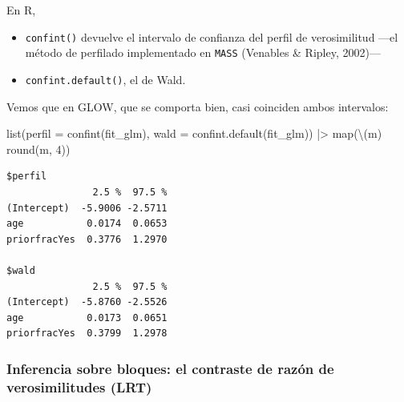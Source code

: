 \documentclass[
  letterpaper,
  DIV=11,
  numbers=noendperiod]{scrartcl}
\newenvironment{Shaded}{\begin{snugshade}}{\end{snugshade}}
\newcommand{\AttributeTok}[1]{\textcolor[rgb]{0.40,0.45,0.13}{#1}}
\newcommand{\DecValTok}[1]{\textcolor[rgb]{0.68,0.00,0.00}{#1}}
\newcommand{\FunctionTok}[1]{\textcolor[rgb]{0.28,0.35,0.67}{#1}}
\newcommand{\NormalTok}[1]{\textcolor[rgb]{0.00,0.23,0.31}{#1}}
\newcommand{\SpecialCharTok}[1]{\textcolor[rgb]{0.37,0.37,0.37}{#1}}
\providecommand{\tightlist}{%
  \setlength{\itemsep}{0pt}\setlength{\parskip}{0pt}}\usepackage{longtable,booktabs,array}
\begin{document}
\begin{tcolorbox}[enhanced jigsaw, coltitle=black, rightrule=.15mm, arc=.35mm, leftrule=.75mm, colback=white, colbacktitle=quarto-callout-tip-color!10!white, left=2mm, breakable, toptitle=1mm, toprule=.15mm, bottomtitle=1mm, titlerule=0mm, title=\textcolor{quarto-callout-tip-color}{\faLightbulb}\hspace{0.5em}{🔧 En R. Intervalos de confianza sobre los coeficientes}, bottomrule=.15mm, opacityback=0, opacitybacktitle=0.6, colframe=quarto-callout-tip-color-frame]

En R,

\begin{itemize}
\tightlist
\item
  \texttt{confint()} devuelve el intervalo de confianza del perfil de
  verosimilitud ---el método de perfilado implementado en \texttt{MASS}
  (Venables \& Ripley, 2002)---
\item
  \texttt{confint.default()}, el de Wald.
\end{itemize}

\end{tcolorbox}

Vemos que en GLOW, que se comporta bien, casi coinciden ambos
intervalos:

\begin{Shaded}
\begin{Highlighting}[]
\FunctionTok{list}\NormalTok{(}\AttributeTok{perfil =} \FunctionTok{confint}\NormalTok{(fit\_glm),}
     \AttributeTok{wald   =} \FunctionTok{confint.default}\NormalTok{(fit\_glm)) }\SpecialCharTok{|\textgreater{}}
  \FunctionTok{map}\NormalTok{(\textbackslash{}(m) }\FunctionTok{round}\NormalTok{(m, }\DecValTok{4}\NormalTok{))}
\end{Highlighting}
\end{Shaded}

\begin{verbatim}
$perfil
               2.5 %  97.5 %
(Intercept)  -5.9006 -2.5711
age           0.0174  0.0653
priorfracYes  0.3776  1.2970

$wald
               2.5 %  97.5 %
(Intercept)  -5.8760 -2.5526
age           0.0173  0.0651
priorfracYes  0.3799  1.2978
\end{verbatim}

\hypertarget{inferencia-sobre-bloques-el-contraste-de-razuxf3n-de-verosimilitudes-lrt}{%
\subsubsection{Inferencia sobre bloques: el contraste de razón de
verosimilitudes
(LRT)}\label{inferencia-sobre-bloques-el-contraste-de-razuxf3n-de-verosimilitudes-lrt}}
\end{document}
